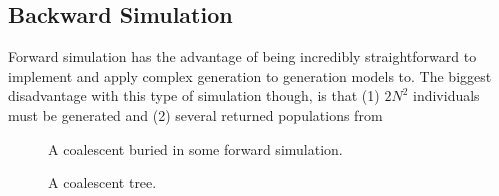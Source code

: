 \subsection{Backward Simulation}\label{subsec:bs}
Forward simulation has the advantage of being incredibly straightforward to implement and apply complex generation to
generation models to.
The biggest disadvantage with this type of simulation though, is that (1) $2N^2$ individuals must be generated and
(2) several returned populations from

\begin{figure}
    \centering
    \subfloat{{  }}
    \qquad \qquad \qquad
    \subfloat{{  }}
    \caption{A coalescent buried in some forward simulation.}
    \label{fig:coalescentBuried}
\end{figure}

\begin{figure}
    \centering
    
    \caption{A coalescent tree.}
    \label{fig:coalescentTree}
\end{figure}